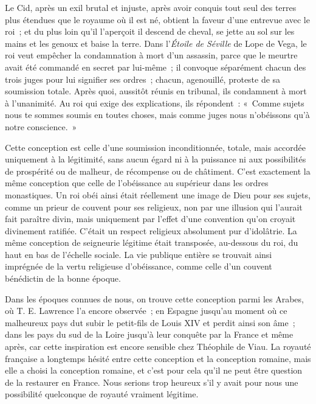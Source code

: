 \documentclass[french,twoside]{book} %
\begin{document}
Le Cid, après un exil brutal et injuste, après avoir conquis tout seul des terres plus étendues que le royaume où il est né, obtient la faveur d'une entrevue avec le roi ; et du plus loin qu'il l'aperçoit il descend de cheval, se jette au sol sur les mains et les genoux et baise la terre. Dans l'{\itshape Étoile de Séville} de Lope de Vega, le roi veut empêcher la condamnation à mort d'un assassin, parce que le meurtre avait été commandé en secret par lui-même ; il convoque séparément chacun des trois juges pour lui signifier ses ordres ; chacun, agenouillé, proteste de sa soumission totale. Après quoi, aussitôt réunis en tribunal, ils condamnent à mort à l'unanimité. Au roi qui exige des explications, ils répondent : « Comme sujets nous te sommes soumis en toutes choses, mais comme juges nous n'obéissons qu'à notre conscience. »\par
Cette conception est celle d'une soumission inconditionnée, totale, mais accordée uniquement à la légitimité, sans aucun égard ni à la puissance ni aux possibilités de prospérité ou de malheur, de récompense ou de châtiment. C'est exactement la même conception que celle de l'obéissance au supérieur dans les ordres monastiques. Un roi obéi ainsi était réellement une image de Dieu pour ses sujets, comme un prieur de couvent pour ses religieux, non par une illusion qui l'aurait fait paraître divin, mais uniquement par l'effet d'une convention qu'on croyait divinement ratifiée. C'était un respect religieux absolument pur d'idolâtrie. La même conception de seigneurie légitime était transposée, au-dessous du roi, du haut en bas de l'échelle sociale. La vie publique entière se trouvait ainsi imprégnée de la vertu religieuse d'obéissance, comme celle d'un couvent bénédictin de la bonne époque.\par
\par
Dans les époques connues de nous, on trouve cette conception parmi les Arabes, où T. E. Lawrence l'a encore observée ; en Espagne jusqu'au moment où ce malheureux pays dut subir le petit-fils de Louis XIV et perdit ainsi son âme ; dans les pays du sud de la Loire jusqu'à leur conquête par la France et même après, car cette inspiration est encore sensible chez Théophile de Viau. La royauté française a longtemps hésité entre cette conception et la conception romaine, mais elle a choisi la conception romaine, et c'est pour cela qu'il ne peut être question de la restaurer en France. Nous serions trop heureux s'il y avait pour nous une possibilité quelconque de royauté vraiment légitime.\par
\end{document}
